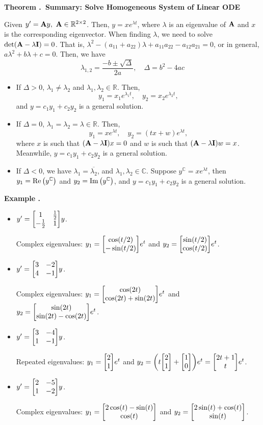 \documentclass[12pt, a4paper]{article}
\newcounter{index}[subsection]
\newenvironment*{eg}{\begin{framed}\par\noindent\textbf{Example \thesubsection.\stepcounter{index}\theindex}}{\par\end{framed}}
\newenvironment*{thm}[1]{\begin{tcolorbox}\par\noindent\textbf{Theorem \thesubsection.\stepcounter{index}\theindex\ #1} \par}{\par\end{tcolorbox}}
\def\R{{\mathbb{R}}}
\def\C{{\mathbb{C}}}
\def\A{\vb A}
\begin{document}
\begin{thm}{Summary: Solve Homogeneous System of Linear ODE}
	Given $y'=\A y,\ \A\in\R^{2\times2}$. Then, $y=xe^{\lambda t}$, where $\lambda$ is an eigenvalue of $\A$ and $x$ is the corresponding eigenvector. When finding $\lambda$, we need to solve $\det(\A-\lambda\vb I)=0$. That is, $\lambda^2-(a_{11}+a_{22})\lambda+a_{11}a_{22}-a_{12}a_{21}=0$, or in general, $a\lambda^2+b\lambda+c=0$. Then, we have \[\lambda_{1,2}=\dfrac{-b\pm\sqrt{\Delta}}{2a},\quad \Delta=b^2-4ac\]
	\begin{itemize}
		\item If $\Delta>0$, $\lambda_1\neq\lambda_2$ and $\lambda_1,\lambda_2\in\R$. Then, \[y_1=x_1e^{\lambda_1t},\quad y_2=x_2e^{\lambda_2t},\] and $y=c_1y_1+c_2y_2$ is a general solution.
		\item If $\Delta=0$, $\lambda_1=\lambda_2=\lambda\in\R$. Then, \[y_1=xe^{\lambda t},\quad y_2=(tx+w)e^{\lambda t},\] where $x$ is such that $(\A-\lambda\vb I)x=0$ and $w$ is such that $(\A-\lambda\vb I)w=x$. Meanwhile, $y=c_1y_1+c_2y_2$ is a general solution.
		\item If $\Delta<0$, we have $\lambda_1=\overline{\lambda_2}$, and $\lambda_1,\lambda_2\in\C$. Suppose $y^\C=xe^{\lambda t }$, then $y_1=\Re\qty(y^\C)$ and $y_2=\Im\qty(y^\C)$, and $y=c_1y_1+c_2y_2$ is a general solution. 
	\end{itemize}
\end{thm}
\begin{eg}
\begin{itemize}
	\item $y'=\mqty[1&\frac{1}{2}\\-\frac{1}{2}&1]y$. \par Complex eigenvalues: $y_1=\mqty[\cos(t/2)\\-\sin(t/2)]e^t$ and $y_2=\mqty[\sin(t/2)\\\cos(t/2)]e^{t}$.
	\item $y'=\mqty[3&-2\\4&-1]y$.\par Complex eigenvalues: $y_1=\mqty[\cos(2t)\\\cos(2t)+\sin(2t)]e^t$ and $y_2=\mqty[\sin(2t)\\\sin(2t)-\cos(2t)]e^t$.
	\item $y'=\mqty[3&-4\\1&-1]y$.\par Repeated eigenvalues: $y_1=\mqty[2\\1]e^t$ and $y_2=\qty(t\mqty[2\\1]+\mqty[1\\0])e^t=\mqty[2t+1\\t]e^t$.
	\item $y'=\mqty[2&-5\\1&-2]y$. \par Complex eigenvalues: $y_1=\mqty[2\cos(t)-\sin(t)\\\cos(t)]$ and $y_2=\mqty[2\sin(t)+\cos(t)\\\sin(t)]$.
\end{itemize}	
\end{eg}
\end{document}
